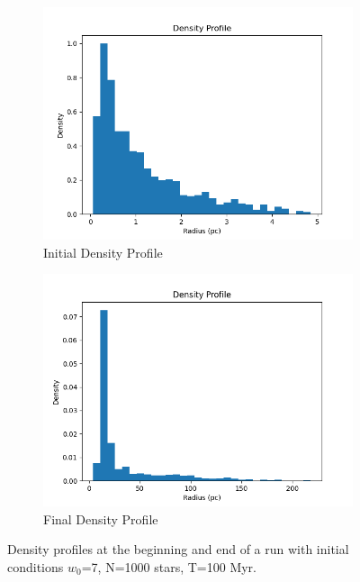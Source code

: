 \documentclass[10pt,twocolumn]{article}
\begin{document}
\begin{figure}
    \centering
    \begin{subfigure}[b]{0.45\linewidth}
        \centering
        \includegraphics[width=\linewidth]{density_profile_initial.png}
        \caption{Initial Density Profile}
        \label{fig:sub1}
    \end{subfigure}
    \hfill
    \begin{subfigure}[b]{0.45\linewidth}
        \centering
        \includegraphics[width=\linewidth]{density_profile.png}
        \caption{Final Density Profile}
        \label{fig:sub2}
    \end{subfigure}
    \caption{Density profiles at the beginning and end of a run with initial conditions $w_0$=7, N=1000 stars, T=100 Myr.}
    \label{fig:density_profile}
\end{figure}
\end{document}
